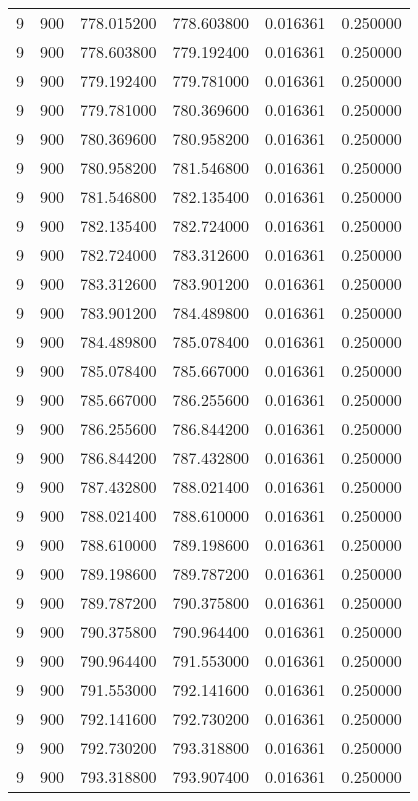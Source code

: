 \begin{longtable}{rrrrrr}
9 & 900 & 778.015200 & 778.603800 & 0.016361 & 0.250000 \\
9 & 900 & 778.603800 & 779.192400 & 0.016361 & 0.250000 \\
9 & 900 & 779.192400 & 779.781000 & 0.016361 & 0.250000 \\
9 & 900 & 779.781000 & 780.369600 & 0.016361 & 0.250000 \\
9 & 900 & 780.369600 & 780.958200 & 0.016361 & 0.250000 \\
9 & 900 & 780.958200 & 781.546800 & 0.016361 & 0.250000 \\
9 & 900 & 781.546800 & 782.135400 & 0.016361 & 0.250000 \\
9 & 900 & 782.135400 & 782.724000 & 0.016361 & 0.250000 \\
9 & 900 & 782.724000 & 783.312600 & 0.016361 & 0.250000 \\
9 & 900 & 783.312600 & 783.901200 & 0.016361 & 0.250000 \\
9 & 900 & 783.901200 & 784.489800 & 0.016361 & 0.250000 \\
9 & 900 & 784.489800 & 785.078400 & 0.016361 & 0.250000 \\
9 & 900 & 785.078400 & 785.667000 & 0.016361 & 0.250000 \\
9 & 900 & 785.667000 & 786.255600 & 0.016361 & 0.250000 \\
9 & 900 & 786.255600 & 786.844200 & 0.016361 & 0.250000 \\
9 & 900 & 786.844200 & 787.432800 & 0.016361 & 0.250000 \\
9 & 900 & 787.432800 & 788.021400 & 0.016361 & 0.250000 \\
9 & 900 & 788.021400 & 788.610000 & 0.016361 & 0.250000 \\
9 & 900 & 788.610000 & 789.198600 & 0.016361 & 0.250000 \\
9 & 900 & 789.198600 & 789.787200 & 0.016361 & 0.250000 \\
9 & 900 & 789.787200 & 790.375800 & 0.016361 & 0.250000 \\
9 & 900 & 790.375800 & 790.964400 & 0.016361 & 0.250000 \\
9 & 900 & 790.964400 & 791.553000 & 0.016361 & 0.250000 \\
9 & 900 & 791.553000 & 792.141600 & 0.016361 & 0.250000 \\
9 & 900 & 792.141600 & 792.730200 & 0.016361 & 0.250000 \\
9 & 900 & 792.730200 & 793.318800 & 0.016361 & 0.250000 \\
9 & 900 & 793.318800 & 793.907400 & 0.016361 & 0.250000 \\

\end{longtable}
